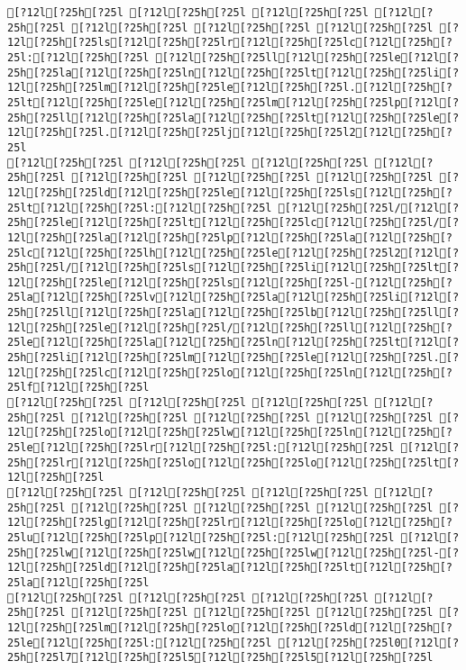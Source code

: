 \documentclass{scrartcl}
\begin{document}
\begin{Verbatim}
[?12l[?25h[?25l [?12l[?25h[?25l [?12l[?25h[?25l [?12l[?25h[?25l [?12l[?25h[?25l [?12l[?25h[?25l [?12l[?25h[?25l [?12l[?25h[?25ls[?12l[?25h[?25lr[?12l[?25h[?25lc[?12l[?25h[?25l:[?12l[?25h[?25l [?12l[?25h[?25ll[?12l[?25h[?25le[?12l[?25h[?25la[?12l[?25h[?25ln[?12l[?25h[?25lt[?12l[?25h[?25li[?12l[?25h[?25lm[?12l[?25h[?25le[?12l[?25h[?25l.[?12l[?25h[?25lt[?12l[?25h[?25le[?12l[?25h[?25lm[?12l[?25h[?25lp[?12l[?25h[?25ll[?12l[?25h[?25la[?12l[?25h[?25lt[?12l[?25h[?25le[?12l[?25h[?25l.[?12l[?25h[?25lj[?12l[?25h[?25l2[?12l[?25h[?25l
[?12l[?25h[?25l [?12l[?25h[?25l [?12l[?25h[?25l [?12l[?25h[?25l [?12l[?25h[?25l [?12l[?25h[?25l [?12l[?25h[?25l [?12l[?25h[?25ld[?12l[?25h[?25le[?12l[?25h[?25ls[?12l[?25h[?25lt[?12l[?25h[?25l:[?12l[?25h[?25l [?12l[?25h[?25l/[?12l[?25h[?25le[?12l[?25h[?25lt[?12l[?25h[?25lc[?12l[?25h[?25l/[?12l[?25h[?25la[?12l[?25h[?25lp[?12l[?25h[?25la[?12l[?25h[?25lc[?12l[?25h[?25lh[?12l[?25h[?25le[?12l[?25h[?25l2[?12l[?25h[?25l/[?12l[?25h[?25ls[?12l[?25h[?25li[?12l[?25h[?25lt[?12l[?25h[?25le[?12l[?25h[?25ls[?12l[?25h[?25l-[?12l[?25h[?25la[?12l[?25h[?25lv[?12l[?25h[?25la[?12l[?25h[?25li[?12l[?25h[?25ll[?12l[?25h[?25la[?12l[?25h[?25lb[?12l[?25h[?25ll[?12l[?25h[?25le[?12l[?25h[?25l/[?12l[?25h[?25ll[?12l[?25h[?25le[?12l[?25h[?25la[?12l[?25h[?25ln[?12l[?25h[?25lt[?12l[?25h[?25li[?12l[?25h[?25lm[?12l[?25h[?25le[?12l[?25h[?25l.[?12l[?25h[?25lc[?12l[?25h[?25lo[?12l[?25h[?25ln[?12l[?25h[?25lf[?12l[?25h[?25l
[?12l[?25h[?25l [?12l[?25h[?25l [?12l[?25h[?25l [?12l[?25h[?25l [?12l[?25h[?25l [?12l[?25h[?25l [?12l[?25h[?25l [?12l[?25h[?25lo[?12l[?25h[?25lw[?12l[?25h[?25ln[?12l[?25h[?25le[?12l[?25h[?25lr[?12l[?25h[?25l:[?12l[?25h[?25l [?12l[?25h[?25lr[?12l[?25h[?25lo[?12l[?25h[?25lo[?12l[?25h[?25lt[?12l[?25h[?25l
[?12l[?25h[?25l [?12l[?25h[?25l [?12l[?25h[?25l [?12l[?25h[?25l [?12l[?25h[?25l [?12l[?25h[?25l [?12l[?25h[?25l [?12l[?25h[?25lg[?12l[?25h[?25lr[?12l[?25h[?25lo[?12l[?25h[?25lu[?12l[?25h[?25lp[?12l[?25h[?25l:[?12l[?25h[?25l [?12l[?25h[?25lw[?12l[?25h[?25lw[?12l[?25h[?25lw[?12l[?25h[?25l-[?12l[?25h[?25ld[?12l[?25h[?25la[?12l[?25h[?25lt[?12l[?25h[?25la[?12l[?25h[?25l
[?12l[?25h[?25l [?12l[?25h[?25l [?12l[?25h[?25l [?12l[?25h[?25l [?12l[?25h[?25l [?12l[?25h[?25l [?12l[?25h[?25l [?12l[?25h[?25lm[?12l[?25h[?25lo[?12l[?25h[?25ld[?12l[?25h[?25le[?12l[?25h[?25l:[?12l[?25h[?25l [?12l[?25h[?25l0[?12l[?25h[?25l7[?12l[?25h[?25l5[?12l[?25h[?25l5[?12l[?25h[?25l

\end{Verbatim}
\end{document}
